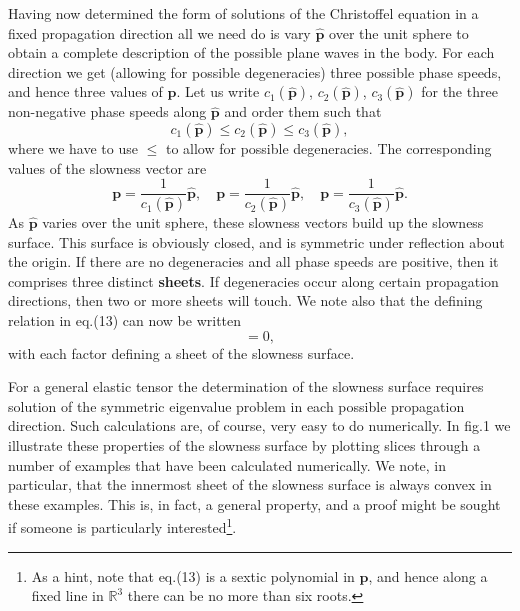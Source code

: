 \documentclass [a4paper,12pt]{paper}
\begin{document}
Having now determined the form of solutions of the Christoffel equation in a fixed propagation direction all we need do is vary $\hat{\mathbf{p}}$ over the unit sphere to obtain a complete description 
of the possible plane waves in the body. For each direction we get (allowing for possible degeneracies) three possible phase speeds, and hence three values of $\mathbf{p}$. Let us write $c_{1}(\hat{\mathbf{p}})$,
 $c_{2}(\hat{\mathbf{p}})$, $c_{3}(\hat{\mathbf{p}})$ for the three non-negative phase speeds along $\hat{\mathbf{p}}$ and order them such that
\begin{equation}
c_{1}(\hat{\mathbf{p}})\le c_{2}(\hat{\mathbf{p}})\le c_{3}(\hat{\mathbf{p}}),
\end{equation}
where we have to use $\le$ to allow for possible degeneracies. The corresponding values of the slowness vector are
\begin{equation}
\mathbf{p}=\frac{1}{c_{1}(\hat{\mathbf{p}})}\hat{\mathbf{p}}, \quad \mathbf{p}=\frac{1}{c_{2}(\hat{\mathbf{p}})}\hat{\mathbf{p}}, \quad \mathbf{p}=\frac{1}{c_{3}(\hat{\mathbf{p}})}\hat{\mathbf{p}}.
\end{equation}
As $\hat{\mathbf{p}}$ varies over the unit sphere, these slowness vectors build up the slowness surface. This surface is obviously closed, and is symmetric under reflection about the origin. If there are 
no degeneracies and all phase speeds are positive, then it comprises three distinct \textbf{sheets}. If degeneracies occur along certain propagation directions, then two or more sheets will touch. 
We note also that the defining relation in eq.(13) can now be written
\begin{equation}
[||\mathbf{p}||^{2}c_{1}(\hat{\mathbf{p}})^{2}-1][||\mathbf{p}||^{2}c_{2}(\hat{\mathbf{p}})^{2}-1][||\mathbf{p}||^{2}c_{3}(\hat{\mathbf{p}})^{2}-1]=0,
\end{equation}
with each factor defining a sheet of the slowness surface.

For a general elastic tensor the determination of the slowness surface requires solution of the symmetric eigenvalue problem in each possible propagation direction. Such calculations are, of course, very easy to do numerically. 
In fig.1 we illustrate these properties of the slowness surface by plotting slices through a number of examples that have been calculated numerically. We note, in particular, that the innermost sheet of the slowness surface is always 
convex in these examples. This is, in fact, a general property, and a proof might be sought if someone is particularly interested\footnote{As a hint, note that eq.(13) is a sextic polynomial in $\mathbf{p}$, and hence along a fixed line in $\mathbb{R}^{3}$ there can be no more than six roots.}.
\end{document}
